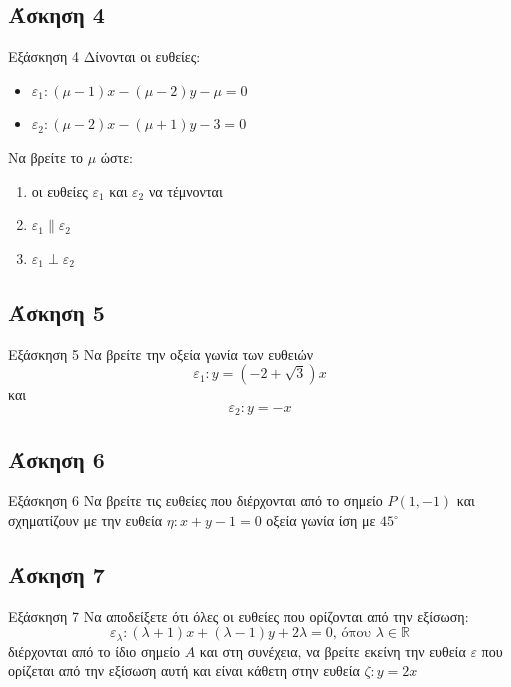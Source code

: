 \documentclass[greek]{beamer}
\begin{document}
\subsection{Άσκηση 4}
\begin{frame}[label=Άσκηση4]{Εξάσκηση 4}
 Δίνονται οι ευθείες:
 \begin{itemize}
  \item $ε_1:(μ-1)x-(μ-2)y-μ=0$
  \item $ε_2:(μ-2)x-(μ+1)y-3=0$
 \end{itemize}
 Να βρείτε το $μ$ ώστε:
 \begin{enumerate}
  \item<1-> οι ευθείες $ε_1$ και $ε_2$ να τέμνονται
  \item<2-> $ε_1 \parallel ε_2$
  \item<3-> $ε_1 \perp ε_2$
 \end{enumerate}

\end{frame}

\subsection{Άσκηση 5}
\begin{frame}[label=Άσκηση5]{Εξάσκηση 5}
 Να βρείτε την οξεία γωνία των ευθειών
 $$ε_1:y=(-2+\sqrt{3})x$$
 και
 $$ε_2:y=-x$$
\end{frame}

\subsection{Άσκηση 6}
\begin{frame}[label=Άσκηση6]{Εξάσκηση 6}
 Να βρείτε τις ευθείες που διέρχονται από το σημείο $Ρ(1,-1)$ και σχηματίζουν με την ευθεία $η:x+y-1=0$ οξεία γωνία ίση με $45^{\circ}$

\end{frame}

\subsection{Άσκηση 7}
\begin{frame}[label=Άσκηση]{Εξάσκηση 7}
 Να αποδείξετε ότι όλες οι ευθείες που ορίζονται από την εξίσωση:
 $$ε_λ:(λ+1)x+(λ-1)y+2λ=0 \text{, όπου } λ\in\mathbb{R}$$
 διέρχονται από το ίδιο σημείο $Α$ και στη συνέχεια, να βρείτε εκείνη την ευθεία $ε$ που ορίζεται από την εξίσωση αυτή και είναι κάθετη στην ευθεία $ζ:y=2x$
\end{frame}
\end{document}
